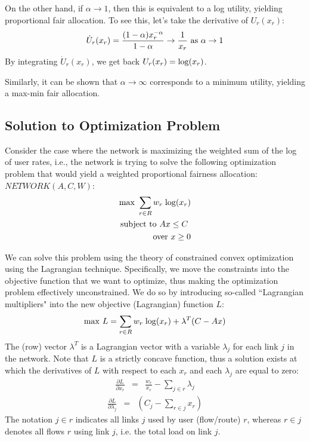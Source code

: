 \documentclass{article}
\def\lg{{\rm log}}
\begin{document}
On the other hand, if $\alpha \rightarrow 1$, then this is equivalent to a log utility, yielding proportional fair allocation. To see this, let's take the derivative of $U_r(x_r)$:
\begin{eqnarray*}
\dot{U}_r(x_r) = \frac{(1-\alpha) x_r^{-\alpha}}{1-\alpha} \rightarrow \frac{1}{x_r}  \ {\rm as}\  \alpha \rightarrow 1
\end{eqnarray*}
By integrating $\dot{U}_r(x_r)$, we get back $U_r(x_r) = \lg(x_r)$.

Similarly, it can be shown that $\alpha \rightarrow \infty$ corresponds to a minimum utility, yielding a max-min fair allocation.

\subsection{Solution to Optimization Problem}
\label{sec:sol-opt}

Consider the case where the network is maximizing the weighted sum of the log of user rates, i.e., the network is trying to solve the following optimization problem that would yield a weighted proportional fairness allocation: \\

$NETWORK(A, C, W):$
\begin{eqnarray*}
{\rm max}\ \sum_{r \in R} w_r \; \lg(x_r) \\
{\rm subject~to}\ A x \leq C \ \\
{\rm over}\ x \geq 0
\end{eqnarray*}

We can solve this problem using the theory of constrained convex optimization using the Lagrangian technique. Specifically, we move the constraints into the objective function that we want to optimize, thus making the optimization problem effectively unconstrained. We do so by introducing so-called ``Lagrangian multipliers" into the new objective (Lagrangian) function $L$:
\begin{eqnarray*}
{\rm max}\ L = \sum_{r \in R} w_r \; \lg(x_r) + \lambda^T(C - Ax)\\
\end{eqnarray*}
The (row) vector $\lambda^T$ is a Lagrangian vector with a variable $\lambda_j$ for each link $j$ in the network.
Note that $L$ is a strictly concave function, thus a solution exists at which the derivatives of $L$ with respect to each $x_r$ and each $\lambda_j$ are equal to zero:
\begin{eqnarray}
  \frac{\partial L}{\partial x_r} & =   & \frac{w_r}{x_r} - \sum_{j \in r} \lambda_j
  \label{eqn:kkt1}
\end{eqnarray}
\begin{eqnarray}
  \frac{\partial L}{\partial \lambda_j} & =  & (C_j - \sum_{r \in j} x_r)  
  \label{eqn:kkt2}
\end{eqnarray}
The notation $j \in r$ indicates all links $j$ used by user (flow/route) $r$,
whereas $r \in j$ denotes all flows $r$ using link $j$, i.e. the total load on link $j$.
\end{document}

